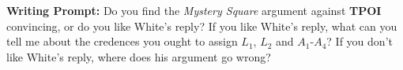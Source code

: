 \documentclass{tufte-handout}
\begin{document}
\begin{exbox}
    \textbf{Writing Prompt:} Do you find the \textit{Mystery Square} argument against \textbf{TPOI} convincing, or do you like White's reply? If you like White's reply, what can you tell me about the credences you ought to assign $L_1$, $L_2$ and $A_1$-$A_4$? If you don't like White's reply, where does his argument go wrong?
\end{exbox}



\end{document}
